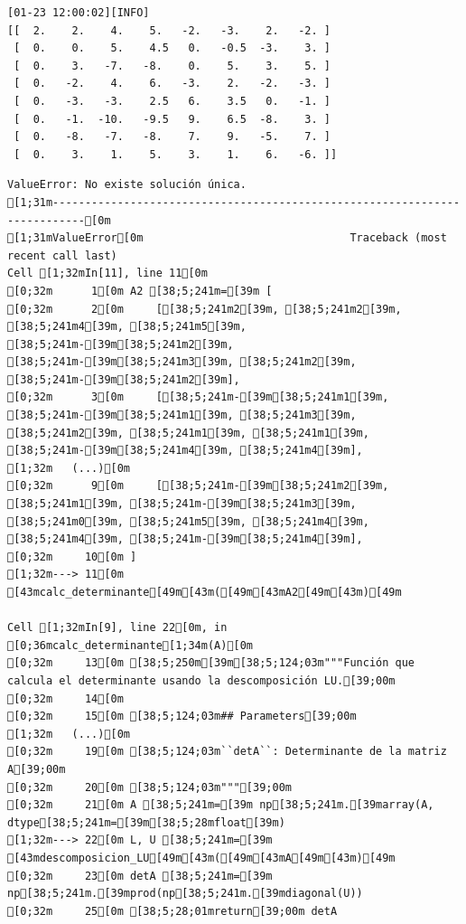 \documentclass[
  letterpaper,
  DIV=11,
  numbers=noendperiod]{scrartcl}
\begin{document}
\begin{verbatim}
[01-23 12:00:02][INFO] 
[[  2.    2.    4.    5.   -2.   -3.    2.   -2. ]
 [  0.    0.    5.    4.5   0.   -0.5  -3.    3. ]
 [  0.    3.   -7.   -8.    0.    5.    3.    5. ]
 [  0.   -2.    4.    6.   -3.    2.   -2.   -3. ]
 [  0.   -3.   -3.    2.5   6.    3.5   0.   -1. ]
 [  0.   -1.  -10.   -9.5   9.    6.5  -8.    3. ]
 [  0.   -8.   -7.   -8.    7.    9.   -5.    7. ]
 [  0.    3.    1.    5.    3.    1.    6.   -6. ]]
\end{verbatim}

\begin{verbatim}
ValueError: No existe solución única.
[1;31m---------------------------------------------------------------------------[0m
[1;31mValueError[0m                                Traceback (most recent call last)
Cell [1;32mIn[11], line 11[0m
[0;32m      1[0m A2 [38;5;241m=[39m [
[0;32m      2[0m     [[38;5;241m2[39m, [38;5;241m2[39m, [38;5;241m4[39m, [38;5;241m5[39m, [38;5;241m-[39m[38;5;241m2[39m, [38;5;241m-[39m[38;5;241m3[39m, [38;5;241m2[39m, [38;5;241m-[39m[38;5;241m2[39m],
[0;32m      3[0m     [[38;5;241m-[39m[38;5;241m1[39m, [38;5;241m-[39m[38;5;241m1[39m, [38;5;241m3[39m, [38;5;241m2[39m, [38;5;241m1[39m, [38;5;241m1[39m, [38;5;241m-[39m[38;5;241m4[39m, [38;5;241m4[39m],
[1;32m   (...)[0m
[0;32m      9[0m     [[38;5;241m-[39m[38;5;241m2[39m, [38;5;241m1[39m, [38;5;241m-[39m[38;5;241m3[39m, [38;5;241m0[39m, [38;5;241m5[39m, [38;5;241m4[39m, [38;5;241m4[39m, [38;5;241m-[39m[38;5;241m4[39m],
[0;32m     10[0m ]
[1;32m---> 11[0m [43mcalc_determinante[49m[43m([49m[43mA2[49m[43m)[49m

Cell [1;32mIn[9], line 22[0m, in [0;36mcalc_determinante[1;34m(A)[0m
[0;32m     13[0m [38;5;250m[39m[38;5;124;03m"""Función que calcula el determinante usando la descomposición LU.[39;00m
[0;32m     14[0m 
[0;32m     15[0m [38;5;124;03m## Parameters[39;00m
[1;32m   (...)[0m
[0;32m     19[0m [38;5;124;03m``detA``: Determinante de la matriz A[39;00m
[0;32m     20[0m [38;5;124;03m"""[39;00m
[0;32m     21[0m A [38;5;241m=[39m np[38;5;241m.[39marray(A, dtype[38;5;241m=[39m[38;5;28mfloat[39m)
[1;32m---> 22[0m L, U [38;5;241m=[39m [43mdescomposicion_LU[49m[43m([49m[43mA[49m[43m)[49m
[0;32m     23[0m detA [38;5;241m=[39m np[38;5;241m.[39mprod(np[38;5;241m.[39mdiagonal(U))
[0;32m     25[0m [38;5;28;01mreturn[39;00m detA


\end{verbatim}
\end{document}
